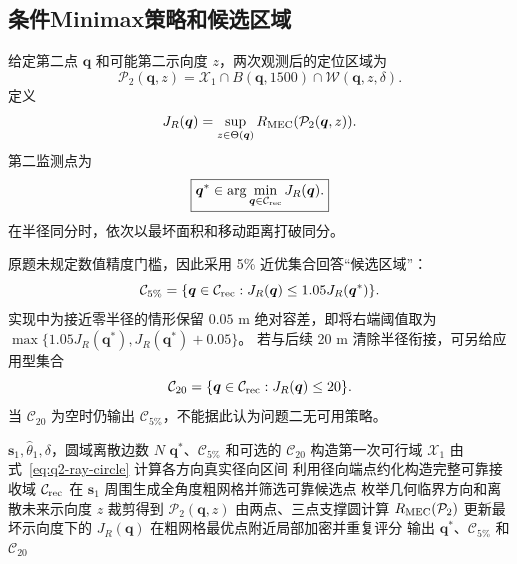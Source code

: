 \subsection{条件Minimax策略和候选区域}

给定第二点 $\bm q$ 和可能第二示向度 $z$，两次观测后的定位区域为
\begin{equation}
 \mathcal P_2(\bm q,z)=\mathcal X_1\cap B(\bm q,1500)
 \cap\mathcal W(\bm q,z,\delta).
 \label{eq:q2-second-set}
\end{equation}
定义
\begin{equation}
 J_R(\bm q)=\sup_{z\in\Theta(\bm q)}
 R_{\rm MEC}(\mathcal P_2(\bm q,z)).
 \label{eq:q2-minimax-radius}
\end{equation}
第二监测点为
\begin{equation}
 \boxed{\bm q^*\in\arg\min_{\bm q\in\mathcal C_{\rm rec}}J_R(\bm q).}
 \label{eq:q2-decision}
\end{equation}
在半径同分时，依次以最坏面积和移动距离打破同分。

原题未规定数值精度门槛，因此采用 5\% 近优集合回答“候选区域”：
\begin{equation}
 \mathcal C_{5\%}=\{\bm q\in\mathcal C_{\rm rec}:
 J_R(\bm q)\le1.05J_R(\bm q^*)\}.
 \label{eq:q2-near-optimal}
\end{equation}
实现中为接近零半径的情形保留 $0.05$ m 绝对容差，即将右端阈值取为
$\max\{1.05J_R(\bm q^*),J_R(\bm q^*)+0.05\}$。
若与后续 20 m 清除半径衔接，可另给应用型集合
\begin{equation}
 \mathcal C_{20}=\{\bm q\in\mathcal C_{\rm rec}:J_R(\bm q)\le20\}.
\end{equation}
当 $\mathcal C_{20}$ 为空时仍输出 $\mathcal C_{5\%}$，不能据此认为问题二无可用策略。

\begin{algorithm}[htbp]
\caption{边界感知Minimax MEC第二监测点算法}
\label{alg:q2-minimax-mec}
\begin{algorithmic}[1]
\Require $\bm s_1,\hat\theta_1,\delta$，圆域离散边数 $N$
\Ensure $\bm q^*$、$\mathcal C_{5\%}$ 和可选的 $\mathcal C_{20}$
\State 构造第一次可行域 $\mathcal X_1$
\State 由式~\eqref{eq:q2-ray-circle} 计算各方向真实径向区间
\State 利用径向端点约化构造完整可靠接收域 $\mathcal C_{\rm rec}$
\State 在 $\bm s_1$ 周围生成全角度粗网格并筛选可靠候选点
  \State 枚举几何临界方向和离散未来示向度 $z$
  \State 裁剪得到 $\mathcal P_2(\bm q,z)$
  \State 由两点、三点支撑圆计算 $R_{\rm MEC}(\mathcal P_2)$
  \State 更新最坏示向度下的 $J_R(\bm q)$
\EndFor
\State 在粗网格最优点附近局部加密并重复评分
\State 输出 $\bm q^*$、$\mathcal C_{5\%}$ 和 $\mathcal C_{20}$
\end{algorithmic}
\end{algorithm}

